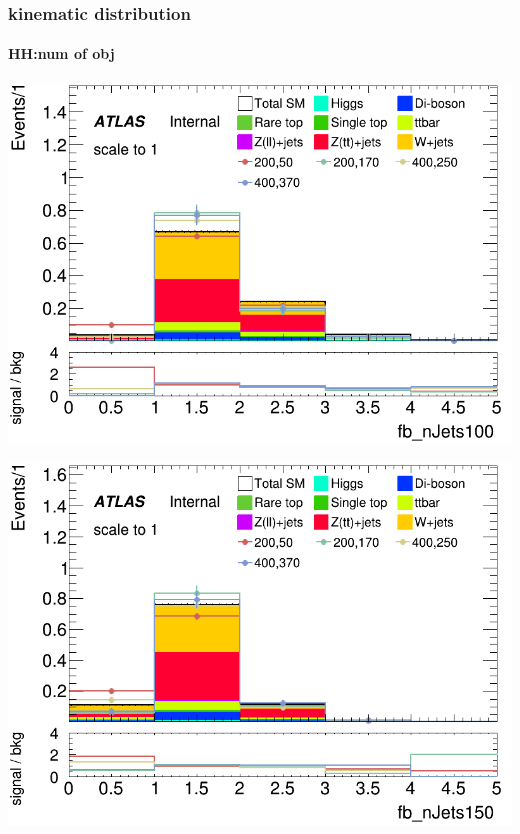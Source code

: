 \documentclass[usenames,dvipsnames]{beamer}
\begin{document}
\begin{frame}
	\frametitle{kinematic distribution}
	\framesubtitle{HH:num of obj}
    \begin{minipage}{0.32\textwidth}
        \centering
        \includegraphics[width=\textwidth]{graphics/HH_met_sig/HH_fb_nJets100_norm.png}
    \end{minipage}
    \hfill
    \begin{minipage}{0.32\textwidth}
        \centering
        \includegraphics[width=\textwidth]{graphics/HH_met_sig/HH_fb_nJets150_norm.png}

\end{minipage}
\end{frame}
\end{document}
